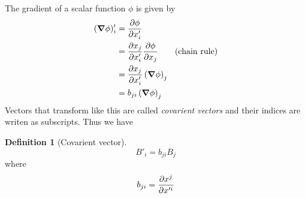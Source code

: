 \documentclass[10pt, a4paper]{extarticle}
\theoremstyle{definition}
\newtheorem{defn}{Definition}
\numberwithin{equation}{subsection}
\begin{document}
The gradient of a scalar function $\phi$ is given by
\begin{align*}
	(\grad\phi)'_i & =\pdv{\phi}{x'_i}                                  \\
	               & =\pdv{x_j}{x'_i}\pdv{\phi}{x_j}\tag*{(chain rule)} \\
	               & =\pdv{x_j}{x'_i} \left(\grad \phi\right)_j         \\
	               & =b_{ji}\left(\grad \phi\right)_j
\end{align*}
Vectors that transform like this are called \emph{covarient vectors} and their indices are writen as subscripts. Thus we have
\begin{framed}
	\begin{defn}[Covarient vector]
		\begin{equation}
			B'_i=b_{ji}B_j
		\end{equation}
		where \begin{equation}b_{ji}=\pdv{x^j}{x'^i}\end{equation}
	\end{defn}
\end{framed}
\end{document}
